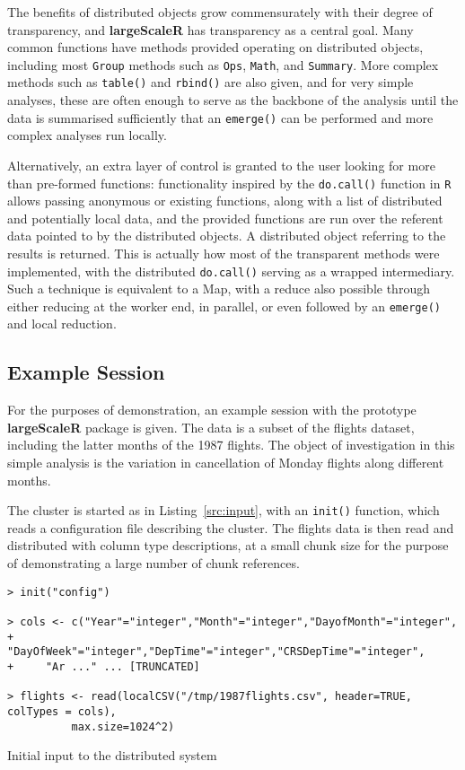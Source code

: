 The benefits of distributed objects grow commensurately with their degree of transparency, and \textbf{largeScaleR} has transparency as a central goal.
Many common functions have methods provided operating on distributed objects, including most \texttt{Group} methods such as \texttt{Ops}, \texttt{Math}, and \texttt{Summary}.
More complex methods such as \texttt{table()} and \texttt{rbind()} are also given, and for very simple analyses, these are often enough to serve as the backbone of the analysis until the data is summarised sufficiently that an \texttt{emerge()} can be performed and more complex analyses run locally.

Alternatively, an extra layer of control is granted to the user looking for more than pre-formed functions:
functionality inspired by the \texttt{do.call()} function in \texttt{R} allows passing anonymous or existing functions, along with a list of distributed and potentially local data, and the provided functions are run over the referent data pointed to by the distributed objects.
A distributed object referring to the results is returned.
This is actually how most of the transparent methods were implemented, with the distributed \texttt{do.call()} serving as a wrapped intermediary.
Such a technique is equivalent to a Map, with a reduce also possible through either reducing at the worker end, in parallel, or even followed by an \texttt{emerge()} and local reduction\cite{mccool2012structured}.

\subsection{Example Session}

For the purposes of demonstration, an example session with the prototype \textbf{largeScaleR} package is given.
The data is a subset of the flights dataset, including the latter months of the 1987 flights.
The object of investigation in this simple analysis is the variation in cancellation of Monday flights along different months.

The cluster is started as in Listing~\ref{src:input}, with an \texttt{init()} function, which reads a configuration file describing the cluster.
The flights data is then read and distributed with column type descriptions, at a small chunk size for the purpose of demonstrating a large number of chunk references.
\begin{listing}%
\begin{verbatim}
> init("config")

> cols <- c("Year"="integer","Month"="integer","DayofMonth"="integer",
+ 	  "DayOfWeek"="integer","DepTime"="integer","CRSDepTime"="integer",
+ 	  "Ar ..." ... [TRUNCATED]

> flights <- read(localCSV("/tmp/1987flights.csv", header=TRUE, colTypes = cols),
		  max.size=1024^2)
\end{verbatim}
\caption{Initial input to the distributed system}\label{src:input}
\end{listing}

